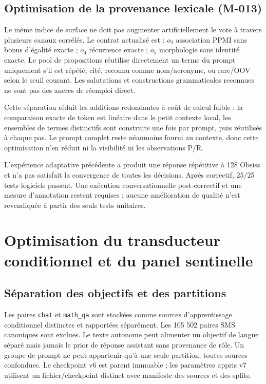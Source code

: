 \documentclass[11pt,a4paper]{report}
\begin{document}
\section{Optimisation de la provenance lexicale (M-013)}

Le même indice de surface ne doit pas augmenter artificiellement le vote à travers plusieurs canaux corrélés. Le contrat actualisé est : $o_2$ association PPMI sans bonus d'égalité exacte ; $o_4$ récurrence exacte ; $o_5$ morphologie sans identité exacte. Le pool de propositions réutilise directement un terme du prompt uniquement s'il est répété, cité, reconnu comme nom/acronyme, ou rare/OOV selon le seuil courant. Les salutations et constructions grammaticales reconnues ne sont pas des ancres de réemploi direct.

Cette séparation réduit les additions redondantes à coût de calcul faible : la comparaison exacte de token est linéaire dans le petit contexte local, les ensembles de termes distinctifs sont construits une fois par prompt, puis réutilisés à chaque pas. Le prompt complet reste néanmoins fourni au contexte, donc cette optimisation n'en réduit ni la visibilité ni les observations P/R.

L'expérience adaptative précédente a produit une réponse répétitive à 128 Obsiss et n'a pas satisfait la convergence de toutes les décisions. Après correctif, 25/25 tests logiciels passent. Une exécution conversationnelle post-correctif et une mesure d'annotation restent requises ; aucune amélioration de qualité n'est revendiquée à partir des seuls tests unitaires.


\chapter{Optimisation du transducteur conditionnel et du panel sentinelle}
\section{Séparation des objectifs et des partitions}
Les paires \texttt{chat} et \texttt{math\_qa} sont stockées comme sources d'apprentissage conditionnel distinctes et rapportées séparément. Les 105 502 paires SMS canoniques sont exclues. Le texte autonome peut alimenter un objectif de langue séparé mais jamais le prior de réponse assistant sans provenance de rôle. Un groupe de prompt ne peut appartenir qu'à une seule partition, toutes sources confondues. Le checkpoint v6 est parent immuable ; les paramètres appris v7 utilisent un fichier/checkpoint distinct avec manifeste des sources et des splits.
\end{document}
